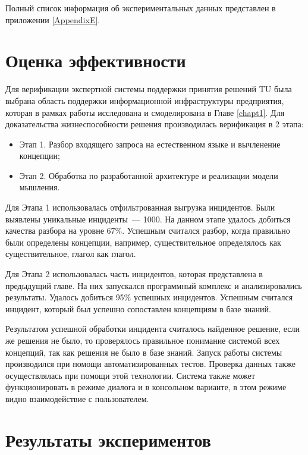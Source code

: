 Полный список информация об экспериментальных данных представлен в приложении \ref{AppendixE}.




\section{Оценка эффективности}
Для верификации экспертной системы поддержки принятия решений TU была выбрана область поддержки информационной инфраструктуры предприятия, которая в рамках работы исследована и смоделирована в Главе \ref{chapt1}. 
Для доказательства жизнеспособности решения производилась верификация в 2 этапа:
\begin{itemize}
	\item Этап 1. Разбор входящего запроса на естественном языке и вычленение концепции;
	\item Этап 2. Обработка по разработанной архитектуре и реализации модели мышления.  
\end{itemize} \par
Для Этапа 1 использовалась отфильтрованная выгрузка инцидентов. Были выявлены уникальные инциденты~--- 1000. На данном этапе удалось добиться качества разбора на уровне 67\%. Успешным считался разбор, когда правильно были определены концепции, например, существительное определялось как существительное, глагол как глагол. \par
Для Этапа 2 использовалась часть инцидентов, которая представлена в предыдущий главе. На них запускался программный комплекс и анализировались результаты. Удалось добиться 95\% успешных инцидентов. Успешным считался инцидент, который был успешно сопоставлен концепциям в базе знаний. \par
Результатом успешной обработки инцидента считалось найденное решение, если же решения не было, то проверялось правильное понимание системой всех концепций, так как решения не было в базе знаний. Запуск работы системы производился при помощи автоматизированных тестов. Проверка данных также осуществлялась при помощи этой технологии. Система также может функционировать в режиме диалога и в консольном варианте, в этом режиме видно взаимодействие с пользователем. 



\section{Результаты экспериментов}


